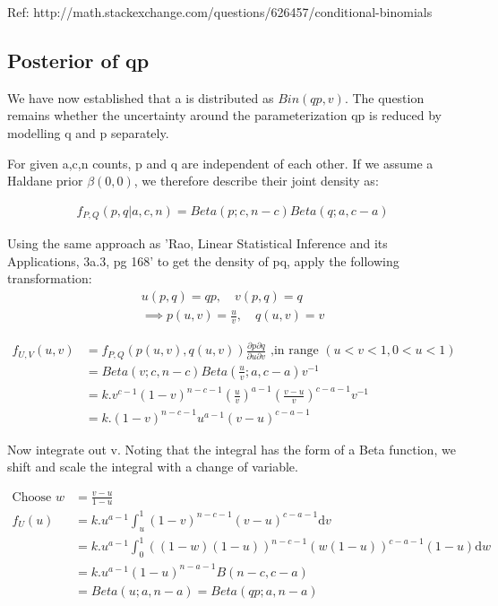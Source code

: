 \documentclass[11pt,a4,singlespacing,titlepagenumber=on]{scrreprt}
\numberwithin{equation}{chapter} %
\theoremstyle{remark}
\begin{document}
Ref: http://math.stackexchange.com/questions/626457/conditional-binomials

\subsection{Posterior of qp}

We have now established that a is distributed as $Bin(qp,v)$. The question remains whether the uncertainty around the parameterization qp is reduced by modelling q and p separately.

For given a,c,n counts, p and q are independent of each other. If we assume a Haldane prior $\beta(0,0)$, we therefore describe their joint density as:

\begin{align}
 f_{P,Q}(p,q|a,c,n) = Beta(p;c,n-c) Beta(q;a,c-a)
\end{align}

Using the same approach as 'Rao, Linear Statistical Inference and its Applications, 3a.3, pg 168' to get the density of pq, apply the following transformation:
\begin{align}
 u(p,q) = qp, \quad v(p,q) = q  \\
 \implies p(u,v) = \frac{u}{v}, \quad q(u,v) = v
\end{align}

\begin{align}
 f_{U,V}(u,v) &= f_{P,Q}(p(u,v),q(u,v)) 
		\frac{\partial p \partial q}{\partial u \partial v} 
		\text{ ,in range }  (u<v<1,0<u<1) \\
 &= Beta(v;c,n-c) Beta(\frac{u}{v};a,c-a) v^{-1} \\
 &= k . v^{c-1} (1-v)^{n-c-1} (\frac{u}{v})^{a-1} (\frac{v - u}{v})^{c-a-1} v^{-1} \\
 &= k . (1-v)^{n-c-1} u^{a-1} (v - u)^{c-a-1}
\end{align}

Now integrate out v. Noting that the integral has the form of a Beta function, we shift and scale the integral with a change of variable.

\begin{align}
\text{Choose }  w &= \frac{v-u}{1-u} \\
f_U(u) &= k.u^{a-1} \int_u^1 (1-v)^{n-c-1} (v - u)^{c-a-1} \mathrm{d}v \\
 &= k.u^{a-1} \int_0^1 ((1-w)(1-u))^{n-c-1} (w(1-u))^{c-a-1} (1-u) \mathrm{d}w \\
 &= k.u^{a-1} (1-u)^{n-a-1} B(n-c,c-a) \\
 &= Beta(u;a,n-a) = Beta(qp;a,n-a) 
\end{align}
\end{document}
